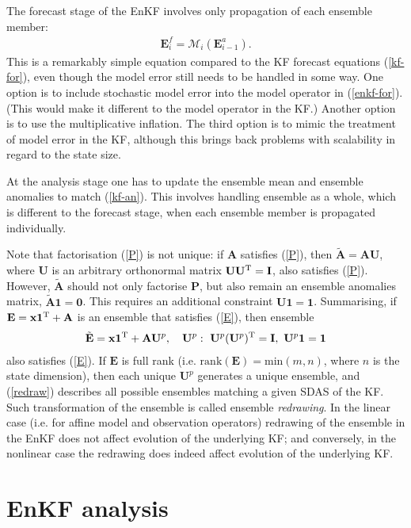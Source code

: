 \documentclass[11pt]{report}
\newcommand{\mb} {\mathbf}
\newcommand{\T}{^{\tiny \mathrm T}}
\begin{document}
The forecast stage of the EnKF involves only propagation of each ensemble member:
\begin{align}
  \label{enkf-for}
  \mb E_i^f = \mathcal M_i(\mb E_{i-1}^a).
\end{align}
This is a remarkably simple equation compared to the KF forecast equations (\ref{kf-for}), even though the model error still needs to be handled in some way.
One option is to include stochastic model error into the model operator in (\ref{enkf-for}).
(This would make it different to the model operator in the KF.)
Another option is to use the multiplicative inflation.
The third option is to mimic the treatment of model error in the KF, although this brings back problems with scalability in regard to the state size.

At the analysis stage one has to update the ensemble mean and ensemble anomalies to match (\ref{kf-an}).
This involves handling ensemble as a whole, which is different to the forecast stage, when each ensemble member is propagated individually.

Note that factorisation (\ref{P}) is not unique: if $\mb A$ satisfies (\ref{P}), then $\tilde {\mb A} = \mb A \mb U$, where $\mb U$ is an arbitrary orthonormal matrix $\mb U \mb U\T = \mb I$, also satisfies (\ref{P}).
However, $\tilde{\mb A}$ should not only factorise $\mb P$, but also remain an ensemble anomalies matrix, $\tilde{\mb A} \mb 1 = \mb 0$.
This requires an additional constraint $\mb U \mb 1 = \mb 1$.
Summarising, if $\mb E = \mb x \mb 1\T + \mb A$ is an ensemble that satisfies (\ref{E}), then ensemble
\begin{align}
  \label{redraw}
  \tilde{\mb E} = \mb x \mb 1\T + \mb A \mb U^p, \quad \mb U^p:\ \mb U^p (\mb U^p)\T = \mb I,\ \mb U^p \mb 1 = \mb 1
\end{align}
also satisfies (\ref{E}). 
If $\mb E$ is full rank (i.e. $\mathrm{rank}(\mb E) = \mathrm{min}(m, n)$, where $n$ is the state dimension), then each unique $\mb U^p$ generates a unique ensemble, and (\ref{redraw}) describes all possible ensembles matching a given SDAS of the KF.
Such transformation of the ensemble is called ensemble \emph{redrawing}.
In the linear case (i.e. for affine model and observation operators) redrawing of the ensemble in the EnKF does not affect evolution of the underlying KF; and conversely, in the nonlinear case the redrawing does indeed affect evolution of the underlying KF.

\section{EnKF analysis}
\end{document}
